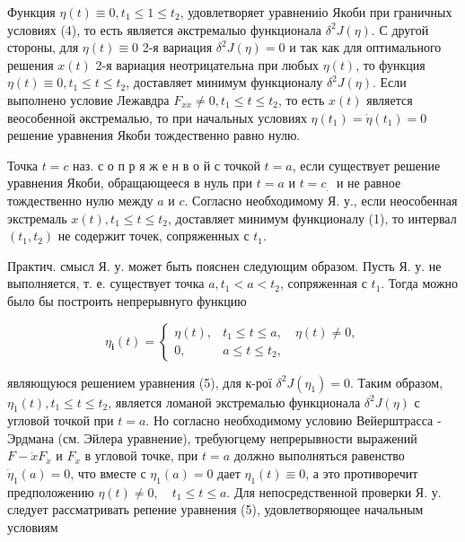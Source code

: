 \documentclass[10pt]{article}
\begin{document}
Функция $\eta(t) \equiv 0, t_{1} \leqslant 1 \leqslant t_{2}$, удовлетворяет уравнениіо Якоби при граничных условиях (4), то есть является әкстремалыо функционала $\delta^{2} J(\eta)$. С другой стороны, для $\eta(t) \equiv 0$ 2-я вариация $\delta^{2} J(\eta)=0$ и так как для оптимального решения $x(t)$ 2-я вариация неотрицательна при любых $\eta(t)$, то функция $\eta(t) \equiv 0, t_{1} \leqslant t \leqslant t_{2}$, доставляет минимум функционалу $\delta^{2} J(\eta)$. Если выполнено условие Лежавдра $F_{\dot{x} \dot{x}} \neq 0, t_{1} \leqslant t \leqslant t_{2}$, то есть $x(t)$ является веособенной әкстремалью, то при начальных условиях $\eta\left(t_{1}\right)=\dot{\eta}\left(t_{1}\right)=0$ решение уравнения Якоби тождественно равно нулю.



Точка $t=c$ наз. с о п р я ж $\mathbf{е}$ н в о й с точкой $t=a$, если существует решение уравнения Якоби, обращающееся в нуль при $t=a$ и $t=c_{\text {. }}$ и не равное тождественно нулю между $a$ и $c$. Согласно необходимому Я. у., если неособенная экстремаль $x(t), t_{1} \leqslant t \leqslant t_{2}$, доставляет минимум функционалу (1), то интервал $\left(t_{1}, t_{2}\right)$ не содержит точек, сопряженных с $t_{1}$.



Практич. смысл Я. у. может быть пояснен следующим образом. Пусть Я. у. не выполняется, т. е. существует точка $a, t_{1}<a<t_{2}$, сопряженная с $t_{1}$. Тогда можно было бы построить непрерывнуго функцию



\[

\eta_{\mathbf{i}}(t)=\left\{\begin{array}{cc}

\eta(t), & t_{1} \leqslant t \leqslant a, \quad \eta(t) \neq 0, \\

0, & a \leqslant t \leqslant t_{2},

\end{array}\right.

\]



являющуюся решением уравнения (5), для к-рої $\delta^{2} J\left(\eta_{1}\right)=0$. Таким образом, $\eta_{1}(t), t_{1} \leqslant t \leqslant t_{2}$, является ломаной экстремалью функционала $\delta^{2} J(\eta)$ с угловой точкой при $t=a$. Но согласно необходимому условию Вейерштрасса - Эрдмана (см. Эйлера уравнение), требуюгцему непрерывности выражений $F-\dot{x} F_{\dot{x}}$ и $F_{\dot{x}}$ в угловой точке, при $t=a$ должно выполняться равенство $\dot{\eta}_{1}(a)=0$, что вместе с $\eta_{1}(a)=0$ дает $\eta_{1}(t) \equiv 0$, а это противоречит предположению $\eta(t) \neq 0, \quad t_{1} \leqslant t \leqslant a$. Для непосредственной проверки Я. у. следует рассматривать репение уравнения (5), удовлетворяющее начальным условиям
\end{document}
